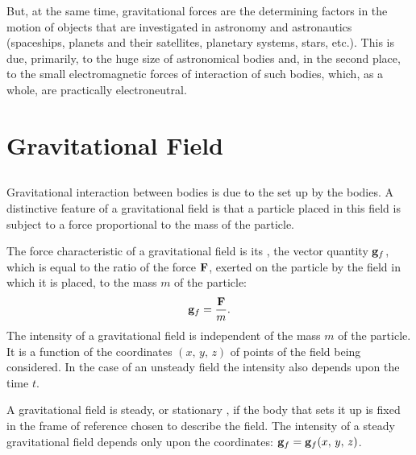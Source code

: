 But, at the same time, gravitational forces are the determining factors in the motion of objects that are investigated in astron­omy and astronautics (spaceships, planets and their satellites, planetary systems, stars, etc.). This is due, primarily, to the huge size of astronomical bodies and, in the second place, to the small electromagnetic forces of interaction of such bodies, which, as a whole, are practically electroneutral.

\section{Gravitational Field}
\label{sec-6.2}

\subsection{}\label{6.2.1} Gravitational interaction between bodies is due to the  set up by the bodies. A distinctive feature of a gravitational field is that a particle placed in this field is subject to a force proportional to the mass of the particle.

The force characteristic of a gravitational field is its , the vector quantity $\vb{g}_{f}$, which is equal to the ratio of the force $\vb{F}$, exerted on the particle by the field in which it is placed, to the mass $m$ of the particle:
\begin{equation*}%
\vb{g}_{f} = \frac{\vb{F}}{m}.
\end{equation*}
The intensity of a gravitational field is independent of the mass $m$ of the particle. It is a function of the coordinates $(x, \,y,\, z)$ of points of the field being considered. In the case of an unsteady field the intensity also depends upon the time $t$.

A gravitational field is steady, or stationary , if the body that sets it up is fixed in the frame of reference chosen to describe the field. The intensity of a steady gravitational field depends only upon the coordinates: $\vb{g}_{f} = \vb{g}_{f} (x,\, y,\, z)$.

